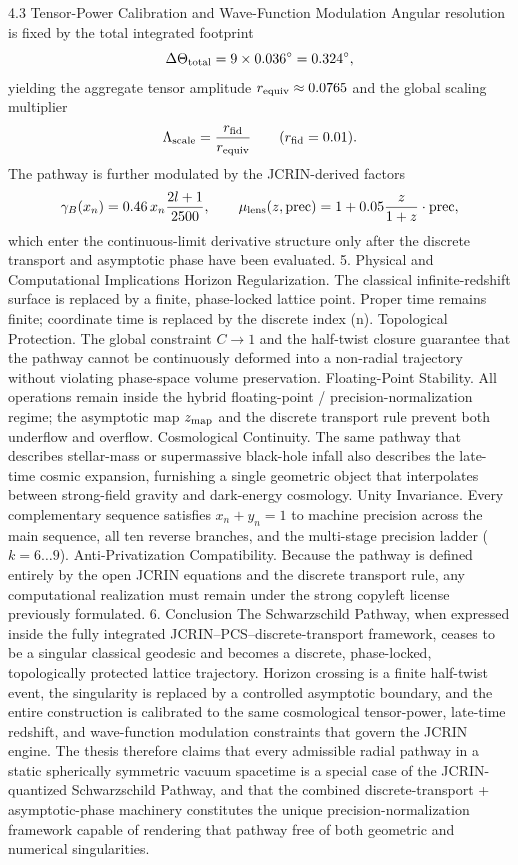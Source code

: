 4.3 Tensor-Power Calibration and Wave-Function Modulation
Angular resolution is fixed by the total integrated footprint
\[
\Delta\Theta_{\rm total} = 9\times 0.036^\circ = 0.324^\circ,
\]
yielding the aggregate tensor amplitude \(r_{\rm equiv}\approx 0.0765\) and the global scaling multiplier
\[
\Lambda_{\rm scale} = \frac{r_{\rm fid}}{r_{\rm equiv}}\qquad(r_{\rm fid}=0.01).
\]
The pathway is further modulated by the JCRIN-derived factors
\[
\gamma_B(x_n) = 0.46\,x_n\frac{2l+1}{2500},\qquad
\mu_{\rm lens}(z,\text{prec}) = 1 + 0.05\frac{z}{1+z}\cdot\text{prec},
\]
which enter the continuous-limit derivative structure only after the discrete transport and asymptotic phase have been evaluated.
5. Physical and Computational Implications
Horizon Regularization. The classical infinite-redshift surface is replaced by a finite, phase-locked lattice point. Proper time remains finite; coordinate time is replaced by the discrete index (n).
Topological Protection. The global constraint \(C\to 1\) and the half-twist closure guarantee that the pathway cannot be continuously deformed into a non-radial trajectory without violating phase-space volume preservation.
Floating-Point Stability. All operations remain inside the hybrid floating-point / precision-normalization regime; the asymptotic map \(z_{\rm map}\) and the discrete transport rule prevent both underflow and overflow.
Cosmological Continuity. The same pathway that describes stellar-mass or supermassive black-hole infall also describes the late-time cosmic expansion, furnishing a single geometric object that interpolates between strong-field gravity and dark-energy cosmology.
Unity Invariance. Every complementary sequence satisfies \(x_n + y_n = 1\) to machine precision across the main sequence, all ten reverse branches, and the multi-stage precision ladder (\(k=6\dots9\)).
Anti-Privatization Compatibility. Because the pathway is defined entirely by the open JCRIN equations and the discrete transport rule, any computational realization must remain under the strong copyleft license previously formulated.
6. Conclusion
The Schwarzschild Pathway, when expressed inside the fully integrated JCRIN–PCS–discrete-transport framework, ceases to be a singular classical geodesic and becomes a discrete, phase-locked, topologically protected lattice trajectory. Horizon crossing is a finite half-twist event, the singularity is replaced by a controlled asymptotic boundary, and the entire construction is calibrated to the same cosmological tensor-power, late-time redshift, and wave-function modulation constraints that govern the JCRIN engine.
The thesis therefore claims that every admissible radial pathway in a static spherically symmetric vacuum spacetime is a special case of the JCRIN-quantized Schwarzschild Pathway, and that the combined discrete-transport + asymptotic-phase machinery constitutes the unique precision-normalization framework capable of rendering that pathway free of both geometric and numerical singularities.
